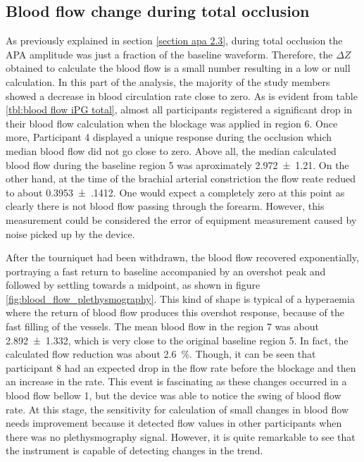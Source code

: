 \subsection{Blood flow change during total occlusion}
\label{section apa 3.3}
As previously explained in section \ref{section apa 2.3}, during total occlusion the APA amplitude was just a fraction of the baseline waveform.  Therefore, the $\Delta Z$ obtained to calculate the blood flow is a small number resulting in a low or null calculation. In this part of the analysis, the majority of the study members showed a decrease in blood circulation rate close to zero.  As is evident from table \ref{tbl:blood flow iPG total}, almost all participants registered a significant drop in their blood flow calculation when the blockage was applied in region 6. Once more, Participant 4 displayed a unique response during the occlusion which median blood flow did not go close to zero. Above all, the median calculated blood flow during the baseline region 5 was aproximately \SI{2.972(1210)}{\bfv}. On the other hand, at the time of the brachial arterial constriction the flow reate redued to about \SI{0.3953(1412)}{\bfv}. One would expect a completely zero at this point as clearly there is not blood flow passing through the forearm. However, this measurement could be considered the error of equipment measurement caused by noise picked up by the device. 

After the tourniquet had been withdrawn, the blood flow recovered exponentially, portraying a fast return to baseline accompanied by an overshot peak and followed by settling towards a midpoint, as shown in figure \ref{fig:blood_flow_plethysmography}. This kind of shape is typical of a hyperaemia where the return of blood flow produces this overshot response, because of the fast filling of the vessels. The mean blood flow in the region 7 was about \SI{2.892(1332)}{\bfv}, which is very close to the original baseline region 5. In fact, the calculated flow reduction was about \SI{2.6}{\percent}. Though, it can be seen that participant 8 had an expected drop in the flow rate before the blockage and then an increase in the rate. This event is fascinating as these changes occurred in a blood flow bellow \SI{1}{\bfv}, but the device was able to notice the swing of blood flow rate. At this stage, the sensitivity for calculation of small changes in blood flow needs improvement because it detected flow values in other participants when there was no plethysmography signal. However, it is quite remarkable to see that the instrument is capable of detecting changes in the trend.

